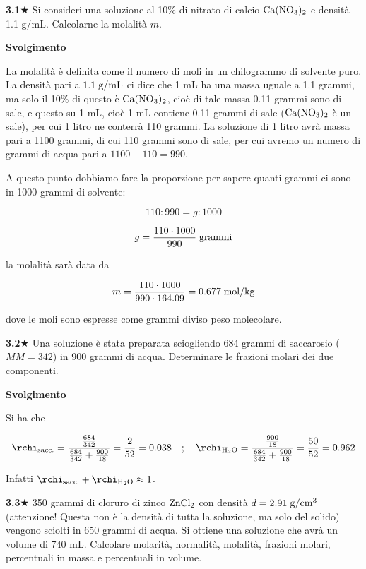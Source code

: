 \textbf{3.1}$\bigstar$ Si consideri una soluzione al 10\% di nitrato di calcio $\rm Ca(NO_3)_2$ e densità 1.1 g/mL. Calcolarne la molalità $m$.

\vspace{0.2cm}\large\textbf{Svolgimento}\normalsize

\vspace{0.2cm}La molalità è definita come il numero di moli in un chilogrammo di solvente puro. La densità pari a $1.1 \; \rm g/mL$ ci dice che 1 mL ha una massa uguale a 1.1 grammi, ma solo il 10\% di questo è $\rm Ca(NO_3)_2$, cioè di tale massa 0.11 grammi sono di sale, e questo su 1 mL, cioè 1 mL contiene 0.11 grammi di sale ($\rm Ca(NO_3)_2$ è un sale), per cui 1 litro ne conterrà 110 grammi. La soluzione di 1 litro avrà massa pari a 1100 grammi, di cui 110 grammi sono di sale, per cui avremo un numero di grammi di acqua pari a $1100-110=990$.

A questo punto dobbiamo fare la proporzione per sapere quanti grammi ci sono in 1000 grammi di solvente:

$$110:990=g:1000$$

$$g=\frac{110 \cdot 1000}{990} \; \rm grammi$$

la molalità sarà data da

$$m=\frac{110 \cdot 1000}{990 \cdot 164.09}=0.677 \; \rm mol/kg$$

dove le moli sono espresse come grammi diviso peso molecolare.

\vspace{0.2cm}\textbf{3.2}$\bigstar$ Una soluzione è stata preparata sciogliendo 684 grammi di saccarosio ($MM=342$) in 900 grammi di acqua. Determinare le frazioni molari dei due componenti.

\vspace{0.2cm}\large\textbf{Svolgimento}\normalsize

\vspace{0.2cm}Si ha che

$$\rchi_{\text{sacc.}}=\frac{\frac{684}{342}}{\frac{684}{342} + \frac{900}{18}}=\frac{2}{52}=0.038
\quad;\quad
\rchi_{\text{H}_2\text{O}}=\frac{\frac{900}{18}}{\frac{684}{342} + \frac{900}{18}}=\frac{50}{52}=0.962$$

\vspace{0.2cm}Infatti $\rchi_{\text{sacc.}} + \rchi_{\text{H}_2\text{O}}\approx 1$.

\vspace{0.2cm}\textbf{3.3}$\bigstar$ 350 grammi di cloruro di zinco $\rm ZnCl_2$ con densità $d=2.91 \; \rm g/cm^3$ (attenzione! Questa non è la densità di tutta la soluzione, ma solo del solido) vengono sciolti in 650 grammi di acqua. Si ottiene una soluzione che avrà un volume di 740 mL. Calcolare molarità, normalità, molalità, frazioni molari, percentuali in massa e percentuali in volume.

